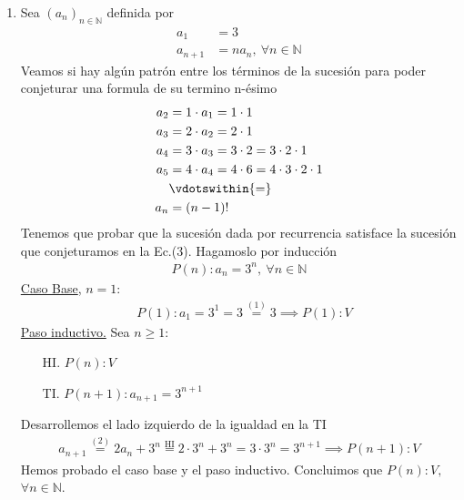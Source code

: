 \begin{enumerate}[label=\roman*)]
    \item Sea $(a_n)_{n \in \mathbb{N}}$ definida por
    \setcounter{equation}{0}
    \begin{align}
        a_1 &= 3 \\
        a_{n+1} &= n a_n,\ \forall n \in \mathbb{N}
    \end{align}
    Veamos si hay algún patrón entre los términos de la sucesión para poder conjeturar una formula de su termino 
    n-ésimo
    \begin{align}
        a_2 &= 1 \cdot a_1 = 1 \cdot 1 \nonumber \\
        a_3 &= 2 \cdot a_2 = 2 \cdot 1 \nonumber \\
        a_4 &= 3 \cdot a_3 = 3 \cdot 2 = 3 \cdot 2 \cdot 1 \nonumber  \\
        a_5 &= 4 \cdot a_4 = 4 \cdot 6 = 4 \cdot 3 \cdot 2 \nonumber \cdot 1 \\
            &\vdotswithin{=} \nonumber \\
        a_n &= (n-1)!
    \end{align}
    Tenemos que probar que la sucesión dada por recurrencia satisface la sucesión que conjeturamos en la Ec.(3). 
    Hagamoslo por inducción
    \begin{align*}
        P(n): a_n = 3^n,\ \forall n \in \mathbb{N}
    \end{align*}
    \underline{Caso Base}, $n = 1$:
	    \begin{align*}
		    &P(1): a_1 = 3^1 = 3 \overset{(1)}{=} 3 \implies P(1):V
	    \end{align*}
	\underline{Paso inductivo.} Sea $n \geq 1$:
	\begin{enumerate}
        \item[HI.] $P(n): V$
        \item[TI.] $P(n+1): a_{n+1} = 3^{n+1}$
    \end{enumerate}
 	Desarrollemos el lado izquierdo de la igualdad en la TI
    \begin{align*}
  	    a_{n+1} \overset{(2)}{=} 2 a_n + 3^n \overset{\text{HI}}{=} 2 \cdot 3^n + 3^n = 3 \cdot 3^n = 3^{n+1} 
        \implies P(n+1):V
    \end{align*}
    Hemos probado el caso base y el paso inductivo. Concluimos que $P(n):V,$ $\forall n \in \mathbb{N}$.


\end{enumerate}
